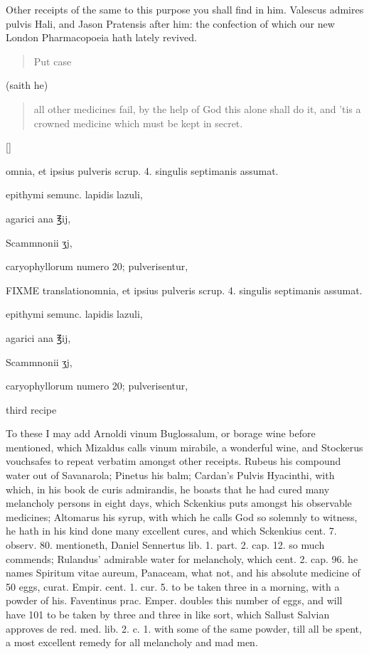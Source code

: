 Other receipts of the same to this purpose you shall find in him. Valescus admires pulvis Hali, and Jason Pratensis after him: the confection of which our new London Pharmacopoeia hath lately revived. \blockquote{Put case} (saith he) \blockquote{all other medicines fail, by the help of God this alone shall do it, and 'tis a crowned medicine which must be kept
in secret.}

\vspace{-2\baselineskip}
\begin{Prescription}[H]
[\baselineskip]
\begin{prescriptionbox}{}{\textlatin{omnia, et ipsius pulveris scrup. 4. singulis septimanis assumat.}}
\item \textlatin{epithymi semunc. lapidis lazuli},
\item \textlatin{agarici ana ℥ij},
\item \textlatin{Scammnonii ʒj},
\item \textlatin{caryophyllorum numero 20; pulverisentur},
\end{prescriptionbox}
\begin{prescriptionbox}{FIXME translation}{\textlatin{omnia, et ipsius pulveris scrup. 4. singulis septimanis assumat.}}
\item \textlatin{epithymi semunc. lapidis lazuli},
\item \textlatin{agarici ana ℥ij},
\item \textlatin{Scammnonii ʒj},
\item \textlatin{caryophyllorum numero 20; pulverisentur},
\end{prescriptionbox}
\caption{third recipe}
\end{Prescription}

To these I may add Arnoldi vinum Buglossalum, or borage wine before
mentioned, which Mizaldus calls vinum mirabile, a wonderful wine,
and Stockerus vouchsafes to repeat verbatim amongst other receipts.
Rubeus his compound water out of Savanarola; Pinetus his balm;
Cardan's Pulvis Hyacinthi, with which, in his book de curis admirandis,
he boasts that he had cured many melancholy persons in eight days,
which Sckenkius puts amongst his observable medicines; Altomarus
his syrup, with which he calls God so solemnly to witness, he
hath in his kind done many excellent cures, and which Sckenkius cent.
7. observ. 80. mentioneth, Daniel Sennertus lib. 1. part. 2. cap. 12.
so much commends; Rulandus' admirable water for melancholy, which cent.
2. cap. 96. he names Spiritum vitae aureum, Panaceam, what not, and his
absolute medicine of 50 eggs, curat. Empir. cent. 1. cur. 5. to be
taken three in a morning, with a powder of his. Faventinus prac.
Emper. doubles this number of eggs, and will have 101 to be taken by
three and three in like sort, which Sallust Salvian approves de red.
med. lib. 2. c. 1. with some of the same powder, till all be spent, a
most excellent remedy for all melancholy and mad men.

